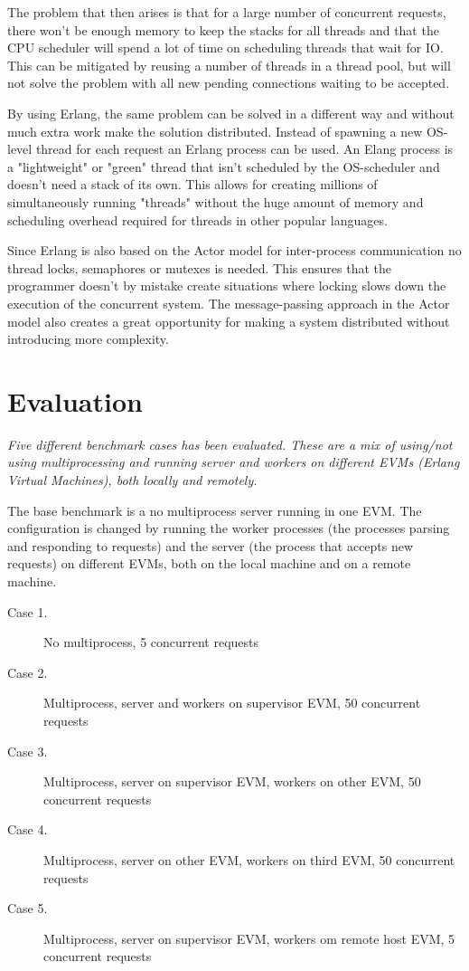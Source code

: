 \documentclass[a4paper, 11pt]{article}
\begin{document}
The problem that then arises is that for a large number of concurrent requests, there won't be enough
memory to keep the stacks for all threads and that the CPU scheduler will spend a lot of time
on scheduling threads that wait for IO.
This can be mitigated by reusing a number of threads in a thread pool, but will not solve the problem
with all new pending connections waiting to be accepted.

By using Erlang, the same problem can be solved in a different way and without much extra work make
 the solution distributed.
Instead of spawning a new OS-level thread for each request an Erlang process can be used. An Elang process
is a "lightweight" or "green" thread that isn't scheduled by the OS-scheduler and doesn't need a stack
 of its own. This allows for creating millions of simultaneously running "threads" without the
  huge amount of memory and scheduling overhead required for threads in other popular languages.

Since Erlang is also based on the Actor model for inter-process communication no thread locks, semaphores
or mutexes is needed. This ensures that the programmer doesn't by mistake create situations where locking
 slows down the execution of the concurrent system. The message-passing approach in the Actor model
 also creates a great opportunity for making a system distributed without introducing more complexity.

\section{Evaluation}

\textit{Five different benchmark cases has been evaluated. These are a mix of using/not using multiprocessing and
running server and workers on different EVMs (Erlang Virtual Machines), both locally and remotely.}

The base benchmark is a no multiprocess server running in one EVM. The configuration is changed by running the worker
processes (the processes parsing and responding to requests) and the server (the process that accepts new requests) on
 different EVMs, both on the local machine and on a remote machine.

\begin{description}
  \item[Case 1.] No multiprocess, 5 concurrent requests
  \item[Case 2.] Multiprocess, server and workers on supervisor EVM, 50 concurrent requests
  \item[Case 3.] Multiprocess, server on supervisor EVM, workers on other EVM, 50 concurrent requests
  \item[Case 4.] Multiprocess, server on other EVM, workers on third EVM, 50 concurrent requests
  \item[Case 5.] Multiprocess, server on supervisor EVM, workers om remote host EVM, 5 concurrent requests
\end{description}
\end{document}
